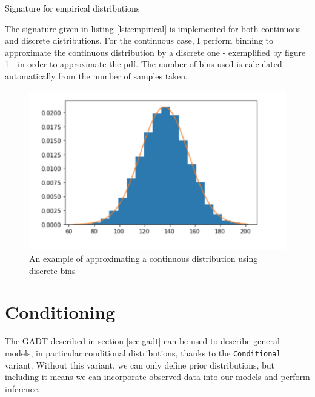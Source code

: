 
\begin{listing}[ht]
	\caption{Signature for empirical distributions}
	\label{lst:empirical}
\end{listing}

The signature given in listing \ref{lst:empirical} is implemented for both continuous and discrete distributions. For the continuous case, I perform binning to approximate the continuous distribution by a discrete one - exemplified by figure \ref{fig:binning} - in order to approximate the pdf. The number of bins used is calculated automatically from the number of samples taken.

\begin{figure}[!hb]
	\centering
	\includegraphics[width=\textwidth]{figs/bins.png}
	\caption{An example of approximating a continuous distribution using discrete bins}
	\label{fig:binning}
\end{figure}

\section{Conditioning} \label{sec:condition}

The GADT described in section \ref{sec:gadt} can be used to describe general models, in particular conditional distributions, thanks to the \texttt{Conditional} variant. Without this variant, we can only define prior distributions, but including it means we can incorporate observed data into our models and perform inference.


